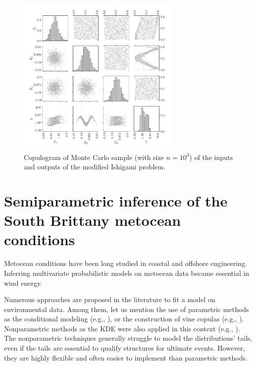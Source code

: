 \begin{figure}
    \centering
    \includegraphics[width=0.7\textwidth]{../numerical_experiments/chapter3/figures/ishigami_copluogram.png}
    \caption{Copulogram of Monte Carlo sample (with size $n=10^3$) of the inputs and outputs of the modified Ishigami problem.}
    \label{fig:ishigami_copulogram}
\end{figure}



\newpage
\section{Semiparametric inference of the South Brittany metocean conditions} \label{sec:32_inference}
Metocean conditions have been long studied in coastal and offshore engineering. 
Inferring multivariate probabilistic models on metocean data became essential in wind energy. 

Numerous approaches are proposed in the literature to fit a model on environmental data. 
Among them, let us mention the use of parametric methods as the conditional modeling (e.g., \citealt{bitner_2015_joint,vanem_fekhari_2023}), or the construction of vine copulas (e.g., \citealt{vanem_2016,montes_2016_cvines_metocean,lin_2019_cvines_waves}). 
Nonparametric methods as the KDE were also applied in this context (e.g., \citealt{han_2018_kde_metocean}). 
The nonparametric techniques generally struggle to model the distributions' tails, even if the tails are essential to qualify structures for ultimate events. 
However, they are highly flexible and often easier to implement than parametric methods.

